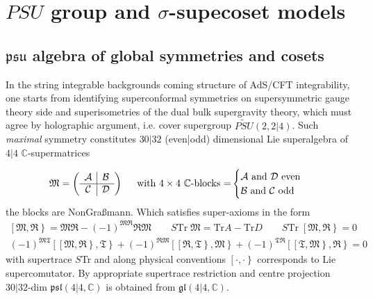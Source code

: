 \documentclass[12pt,a4paper]{article}
\numberwithin{equation}{section}
\newcommand{\alg}[1]{\mathfrak{#1}}
\begin{document}
\iffalse

\section{ $ PSU $ group and $ \sigma $-supecoset models }
\subsection{ $ \alg{psu} $ algebra of global symmetries and cosets}
In the string integrable backgrounds coming structure of AdS/CFT integrability, one starts from identifying superconformal symmetries on supersymmetric gauge theory side and superisometries of the dual bulk supergravity theory, which must agree by holographic argument, i.e. cover supergroup $ \widetilde{PSU}(2,2 \vert 4) $. Such \textit{maximal} symmetry constitutes $ 30 \vert 32 $ (even|odd) dimensional Lie superalgebra of $ 4 \vert 4 $ $ \mathbb{C} $-supermatrices 

\begin{align*}\label{key}
	\mathfrak{M} =
	\left(
	\begin{array}{c | c}
		\mathcal{A} & \mathcal{B} \\
		\hline
		\mathcal{C} & \mathcal{D} \\
	\end{array}
	\right) \hspace{5mm}  \text{with $ 4 \times 4 $ $ \mathbb{C} $-blocks $ = $}
	\begin{cases}
		\mathcal{A} \text{ and }\mathcal{D} \text{ even}\\
		\mathcal{B} \text{ and }\mathcal{C}\text{ odd}
	\end{cases}
\end{align*}
the blocks are NonGraßmann. Which satisfies super-axioms in the form
\begin{align*}
	\left. \left[ \mathfrak{M} , \mathfrak{R} \right. \right\} = \mathfrak{M}\mathfrak{R}-(-1)^{\mathfrak{M}\mathfrak{R}}\mathfrak{R}\mathfrak{M} \qquad S\text{Tr}\; \mathfrak{M} = \text{Tr}A - \text{Tr}D \qquad S\text{Tr}\;\left. \left[ \mathfrak{M} , \mathfrak{R} \right. \right\} = 0 \\
	(-1)^{\mathfrak{M}\mathfrak{T}} \left. \left[ \left. \left[ \mathfrak{M} , \mathfrak{R} \right. \right\} , \mathfrak{T} \right. \right\} + (-1)^{\mathfrak{R}\mathfrak{M}} \left. \left[ \left. \left[ \mathfrak{R} , \mathfrak{T} \right. \right\} , \mathfrak{M} \right. \right\} + (-1)^{\mathfrak{T}\mathfrak{R}} \left. \left[ \left. \left[ \mathfrak{T} , \mathfrak{M} \right. \right\} , \mathfrak{R} \right. \right\} = 0
\end{align*}
with supertrace $ S $Tr and along physical conventions $ \left. \left[ \cdot, \cdot \right. \right\} $ corresponds to Lie supercomutator.	By appropriate supertrace restriction and centre projection $ 30\vert32 $-dim $ \alg{psl}(4\vert4, \mathbb{C}) $ is obtained from $ \alg{gl}(4\vert4,\mathbb{C}) $.
\end{document}
